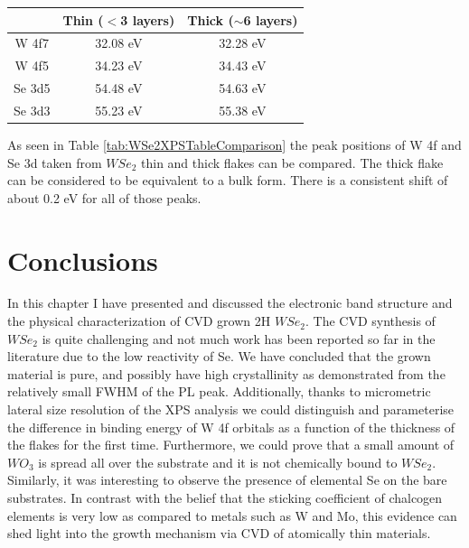 \begin{center}
\begin{tabular}{c|cc}
		& Thin ($<$3 layers) 	& Thick ($\sim$6 layers)\\ \hline
W 4f7	& 32.08 eV				& 32.28 eV				\\ 
W 4f5	& 34.23 eV				& 34.43 eV				\\
Se 3d5 	& 54.48 eV				& 54.63 eV				\\
Se 3d3  & 55.23 eV				& 55.38 eV				
\end{tabular}
\end{center}
As seen in Table \ref{tab:WSe2XPSTableComparison} the peak positions of W 4f and Se 3d taken from $WSe_2$ thin and thick flakes can be compared. The thick flake can be considered to be equivalent to a bulk form. There is a consistent shift of about 0.2 eV for all of those peaks.

\section{Conclusions}

In this chapter I have presented and discussed the electronic band structure and the physical characterization of CVD grown 2H $WSe_2$.
The CVD synthesis of $WSe_2$ is quite challenging and not much work has been reported so far in the literature due to the low reactivity of Se. We have concluded that the grown material is pure, and possibly have high crystallinity as demonstrated from the relatively small FWHM of the PL peak. Additionally, thanks to micrometric lateral size resolution of the XPS analysis we could distinguish and parameterise the difference in binding energy of W 4f orbitals as a function of the thickness of the flakes for the first time. Furthermore, we could prove that a small amount of $WO_3$ is spread all over the substrate and it is not chemically bound to $WSe_2$. Similarly, it was interesting to observe the presence of elemental Se on the bare substrates. In contrast with the belief that the sticking coefficient of chalcogen elements is very low as compared to metals such as W and Mo, this evidence can shed light into the growth mechanism via CVD of atomically thin materials.